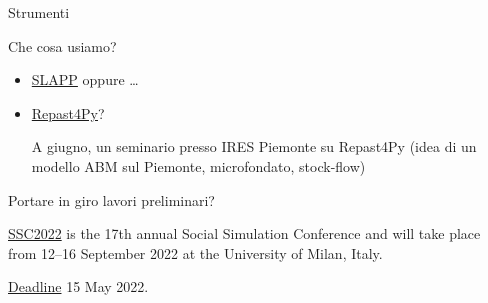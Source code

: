 \documentclass[]{beamer}
\begin{document}
\begin{frame}{Strumenti}

Che cosa usiamo?

\begin{itemize}

\item
\href{https://terna.github.io/SLAPP/}{SLAPP} oppure \ldots

\item
\href{https://repast.github.io/repast4py.site/index.html}{Repast4Py}?

A giugno, un seminario presso IRES Piemonte su Repast4Py (idea di un modello ABM sul Piemonte, microfondato, stock-flow)

\end{itemize}

Portare in giro lavori preliminari?

\href{https://ssc2022.behavelab.org}{SSC2022} is the 17th annual Social Simulation Conference and will take place from 12--16 September 2022 at the University of Milan, Italy.

\href{https://ssc2022.behavelab.org/submissions/}{Deadline} 15 May 2022.

\end{frame}
\end{document}
